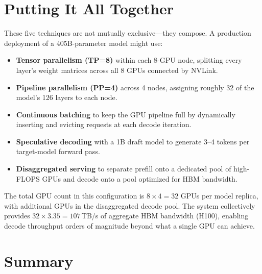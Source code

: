 \section{Putting It All Together}
\label{sec:distributed:together}

These five techniques are not mutually exclusive---they compose. A production deployment of a 405B-parameter model might use:

\begin{itemize}
\item \textbf{Tensor parallelism (TP=8)} within each 8-GPU node, splitting every layer's weight matrices across all 8 GPUs connected by NVLink.
\item \textbf{Pipeline parallelism (PP=4)} across 4 nodes, assigning roughly 32 of the model's 126 layers to each node.
\item \textbf{Continuous batching} to keep the GPU pipeline full by dynamically inserting and evicting requests at each decode iteration.
\item \textbf{Speculative decoding} with a 1B draft model to generate 3--4 tokens per target-model forward pass.
\item \textbf{Disaggregated serving} to separate prefill onto a dedicated pool of high-FLOPS GPUs and decode onto a pool optimized for HBM bandwidth.
\end{itemize}

The total GPU count in this configuration is $8 \times 4 = 32$ GPUs per model replica, with additional GPUs in the disaggregated decode pool. The system collectively provides $32 \times 3.35 = 107$\,TB/s of aggregate HBM bandwidth (H100), enabling decode throughput orders of magnitude beyond what a single GPU can achieve.

\section{Summary}

